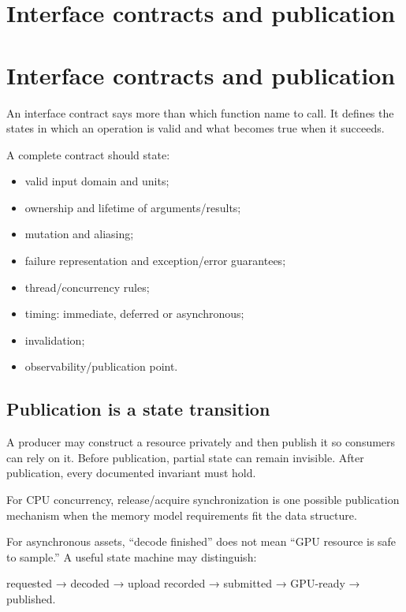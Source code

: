 \hypertarget{appendix-fdae7ff0a23f}{}
\section*{Interface contracts and publication}
\section{Interface contracts and publication}\label{appendix-fdae7ff0a23f-interface-contracts-and-publication}

An interface contract says more than which function name to call. It defines the states in which an operation is valid and what becomes true when it succeeds.

A complete contract should state:

\begin{itemize}
\tightlist
\item
  valid input domain and units;
\item
  ownership and lifetime of arguments/results;
\item
  mutation and aliasing;
\item
  failure representation and exception/error guarantees;
\item
  thread/concurrency rules;
\item
  timing: immediate, deferred or asynchronous;
\item
  invalidation;
\item
  observability/publication point.
\end{itemize}

\subsection{Publication is a state transition}\label{appendix-fdae7ff0a23f-publication-is-a-state-transition}

A producer may construct a resource privately and then publish it so consumers can rely on it. Before publication, partial state can remain invisible. After publication, every documented invariant must hold.

For CPU concurrency, release/acquire synchronization is one possible publication mechanism when the memory model requirements fit the data structure.

For asynchronous assets, ``decode finished'' does not mean ``GPU resource is safe to sample.'' A useful state machine may distinguish:

requested → decoded → upload recorded → submitted → GPU-ready → published.

